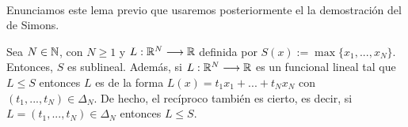 	\paragraph{} Enunciamos este lema previo que usaremos posteriormente el la demostración del de Simons. 
	\begin{lemaBox}\label{lema2.1}
		Sea $ N \in \mathbb{N} $, con $ N \geq 1 $ y $ L: \mathbb{R}^N \longrightarrow \mathbb{R} $ definida por $ S(x):=\max\{x_1,...,x_N\}$. Entonces, $ S $ es sublineal. Además, si $ L:\mathbb{R}^N \longrightarrow \mathbb{R} $ es un funcional lineal tal que $ L \leq S $ entonces $ L $ es de la forma $ L(x) = t_1 x_1 + ... + t_N x_N $ con $ (t_1,...,t_N) \in \Delta_N$. De hecho, el recíproco también es cierto, es decir, si $ L =  (t_1,...,t_N) \in \Delta_N $ entonces $ L \leq S $.
		
		
	\end{lemaBox}

